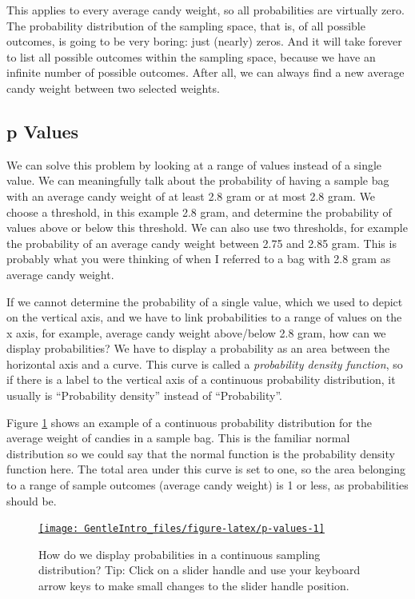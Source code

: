 \documentclass[a4paper]{book}
\theoremstyle{definition}
\theoremstyle{definition}
\theoremstyle{definition}
\theoremstyle{remark}
\begin{document}
This applies to every average candy weight, so all probabilities are
virtually zero. The probability distribution of the sampling space, that
is, of all possible outcomes, is going to be very boring: just (nearly)
zeros. And it will take forever to list all possible outcomes within the
sampling space, because we have an infinite number of possible outcomes.
After all, we can always find a new average candy weight between two
selected weights.

\subsection{p Values}\label{p-values}

We can solve this problem by looking at a range of values instead of a
single value. We can meaningfully talk about the probability of having a
sample bag with an average candy weight of at least 2.8 gram or at most
2.8 gram. We choose a threshold, in this example 2.8 gram, and determine
the probability of values above or below this threshold. We can also use
two thresholds, for example the probability of an average candy weight
between 2.75 and 2.85 gram. This is probably what you were thinking of
when I referred to a bag with 2.8 gram as average candy weight.

If we cannot determine the probability of a single value, which we used
to depict on the vertical axis, and we have to link probabilities to a
range of values on the x axis, for example, average candy weight
above/below 2.8 gram, how can we display probabilities? We have to
display a probability as an area between the horizontal axis and a
curve. This curve is called a \emph{probability density function}, so if
there is a label to the vertical axis of a continuous probability
distribution, it usually is ``Probability density'' instead of
``Probability''.

Figure \ref{fig:p-values} shows an example of a continuous probability
distribution for the average weight of candies in a sample bag. This is
the familiar normal distribution so we could say that the normal
function is the probability density function here. The total area under
this curve is set to one, so the area belonging to a range of sample
outcomes (average candy weight) is 1 or less, as probabilities should
be.

\begin{figure}[H]
\href{http://82.196.4.233:3838/apps/p-values/}{\texttt{[image: GentleIntro\_files/figure-latex/p-values-1]} }\caption{How do we display probabilities in a continuous sampling distribution? Tip: Click on a slider handle and use your keyboard arrow keys to make small changes to the slider handle position.}\label{fig:p-values}
\end{figure}
\end{document}
